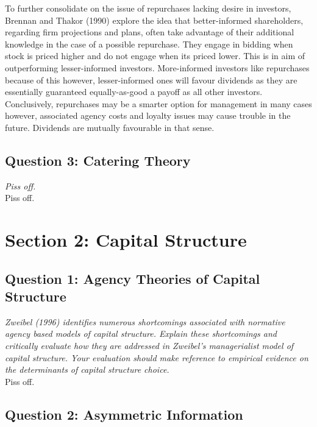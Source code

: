 \documentclass[11pt, english]{article}
\begin{document}
	To further consolidate on the issue of repurchases lacking desire in investors, Brennan and Thakor (1990) explore the idea that better-informed shareholders, regarding firm projections and plans, often take advantage of their additional knowledge in the case of a possible repurchase. They engage in bidding when stock is priced higher and do not engage when its priced lower. This is in aim of outperforming lesser-informed investors. More-informed investors like repurchases because of this however, lesser-informed ones will favour dividends as they are essentially guaranteed equally-as-good a payoff as all other investors. Conclusively, repurchases may be a smarter option for management in many cases however, associated agency costs and loyalty issues may cause trouble in the future. Dividends are mutually favourable in that sense.

	\newpage

	\subsection{Question 3: Catering Theory}

	\textit{Piss off.}\\

	Piss off.
	
\newpage

\section{Section 2: Capital Structure}

	\subsection{Question 1: Agency Theories of Capital Structure}

	\textit{Zweibel (1996) identifies numerous shortcomings associated with normative agency based models of capital structure. Explain these shortcomings and critically evaluate how they are addressed in Zweibel’s managerialist model of capital structure. Your evaluation should make reference to empirical evidence on the determinants of capital structure choice.}\\

	Piss off.

	\newpage 

	\subsection{Question 2: Asymmetric Information}
\end{document}
